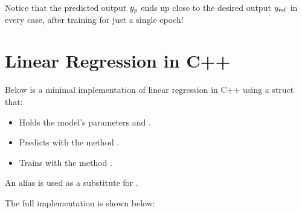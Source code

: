 Notice that the predicted output $y_{p}$ ends up close to the desired output $y_{\mathrm{ref}}$ in every case,
after training for just a single epoch!

\section{Linear Regression in C++}
\label{c1:sec:cpp}
Below is a minimal implementation of linear regression in C++ using a struct  that:
\begin{itemize}
  \item Holds the model's parameters  and .
  \item Predicts with the method .
  \item Trains with the method .
\end{itemize}

\note[Note!] An alias  is used as a substitute for .

The full implementation is shown below:

